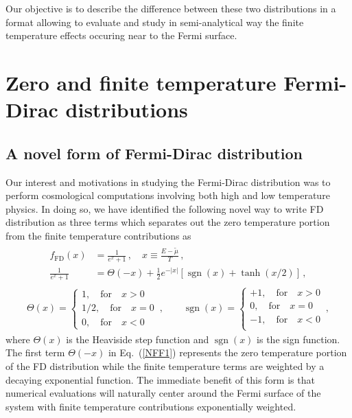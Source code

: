 \documentclass[sn-mathphys,Numbered]{sn-jnl}
\newcommand{\req}[1]{Eq.~(\ref{#1})}
\DeclareMathOperator{\sgn}{sgn}
\begin{document}
Our objective is to describe the difference between these two distributions in a format allowing to evaluate and study in semi-analytical way the finite temperature effects occuring near to the Fermi surface.

\section{Zero and finite temperature Fermi-Dirac distributions}
\label{NewFermi}
\subsection{A novel form of Fermi-Dirac distribution}
\label{Novel}
Our interest and motivations in studying the Fermi-Dirac distribution was to perform cosmological computations involving both high and low temperature physics. In doing so, we have identified the following novel way to write FD distribution as three terms which separates out the zero temperature portion from the finite temperature contributions as 
\begin{align}
\label{NFF1}
\begin{split}
f_\mathrm{FD}(x)
&=\frac{1}{e^{x}+1}\,,\quad
x\equiv\frac{E-\widetilde\mu}{T}\,,\\
\frac{1}{e^{x} +1}&=\Theta(-x)+\frac{1}{2}e^{-|x|}\left[\sgn(x)+\tanh(x/2)\right]
\,,
\end{split}
\end{align}
\begin{align}
\label{NFF2}
\Theta(x)=\left\{
\begin{array}{r}
1,\quad\mathrm{for}\quad{x}>0\\
1/2,\quad\mathrm{for}\quad{x}=0\\
0,\quad\mathrm{for}\quad{x}<0
\end{array}\right.\,,\qquad
\sgn(x)=\left\{
\begin{array}{r}
+1,\quad\mathrm{for}\quad{x}>0\\
0,\quad\mathrm{for}\quad{x}=0\\
-1,\quad\mathrm{for}\quad{x}<0\\
\end{array}\right.\,,
\end{align}
where $\Theta(x)$ is the Heaviside step function and $\sgn(x)$ is the sign function. The first term $\Theta(-x)$ in \req{NFF1} represents the zero temperature portion of the FD distribution while the finite temperature terms are weighted by a decaying exponential function. The immediate benefit of this form is that numerical evaluations will naturally center around the Fermi surface of the system with finite temperature contributions exponentially weighted.
\end{document}
